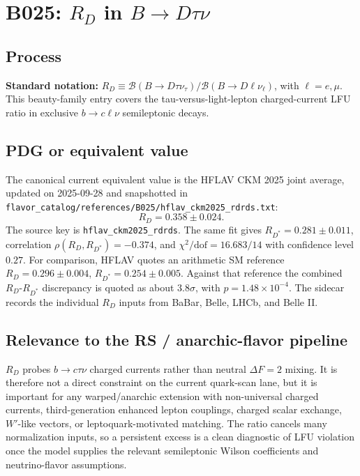
\section{B025: \(R_D\) in \(B\to D\tau\nu\)}

\subsection*{Process}
\textbf{Standard notation:} \(R_D\equiv
\mathcal{B}(B\to D\tau\nu_\tau)/\mathcal{B}(B\to D\ell\nu_\ell)\), with
\(\ell=e,\mu\).  This beauty-family entry covers the tau-versus-light-lepton
charged-current LFU ratio in exclusive \(b\to c\ell\nu\) semileptonic decays.

\subsection*{PDG or equivalent value}
The canonical current equivalent value is the HFLAV CKM 2025 joint average,
updated on 2025-09-28 and snapshotted in
\texttt{flavor\_catalog/references/B025/hflav\_ckm2025\_rdrds.txt}:
\[
  R_D = 0.358 \pm 0.024 .
\]
The source key is \texttt{hflav\_ckm2025\_rdrds}.  The same fit gives
\(R_{D^*}=0.281\pm0.011\), correlation
\(\rho(R_D,R_{D^*})=-0.374\), and \(\chi^2/\mathrm{dof}=16.683/14\)
with confidence level \(0.27\).  For comparison, HFLAV quotes an arithmetic
SM reference \(R_D=0.296\pm0.004\), \(R_{D^*}=0.254\pm0.005\).  Against that
reference the combined \(R_D\)-\(R_{D^*}\) discrepancy is quoted as about
\(3.8\sigma\), with \(p=1.48\times10^{-4}\).  The sidecar records the
individual \(R_D\) inputs from BaBar, Belle, LHCb, and Belle II.

\subsection*{Relevance to the RS / anarchic-flavor pipeline}
\(R_D\) probes \(b\to c\tau\nu\) charged currents rather than neutral
\(\Delta F=2\) mixing.  It is therefore not a direct constraint on the current
quark-scan lane, but it is important for any warped/anarchic extension with
non-universal charged currents, third-generation enhanced lepton couplings,
charged scalar exchange, \(W'\)-like vectors, or leptoquark-motivated matching.
The ratio cancels many normalization inputs, so a persistent excess is a clean
diagnostic of LFU violation once the model supplies the relevant semileptonic
Wilson coefficients and neutrino-flavor assumptions.

